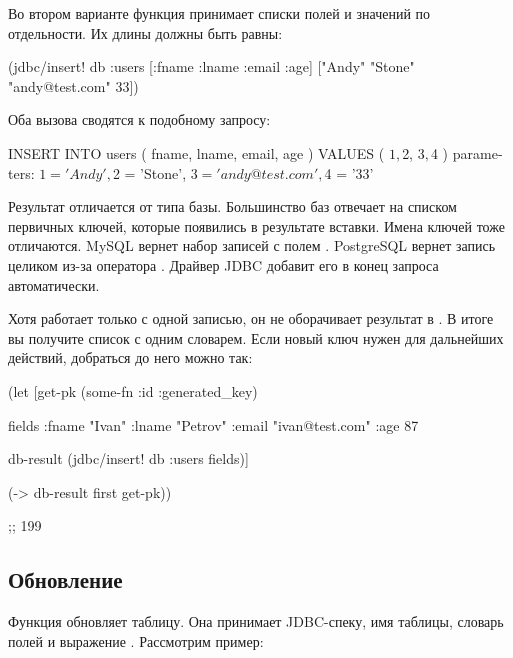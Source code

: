 Во втором варианте функция принимает списки полей и значений по отдельности. Их длины должны быть равны:

\begin{english}
  \begin{clojure}
(jdbc/insert! db :users
              [:fname :lname :email :age]
              ["Andy" "Stone" "andy@test.com" 33])
  \end{clojure}
\end{english}

Оба вызова сводятся к подобному запросу:

\begin{english}
  \begin{sql}
INSERT INTO users ( fname, lname, email, age )
VALUES ( $1, $2, $3, $4 )
parameters:
  $1 = 'Andy', $2 = 'Stone',
  $3 = 'andy@test.com', $4 = '33'
  \end{sql}
\end{english}

Результат  отличается от типа базы. Большинство баз отвечает на  списком первичных ключей, которые появились в результате вставки. Имена ключей тоже отличаются. MySQL вернет набор записей с полем . PostgreSQL вернет запись целиком из-за оператора . Драйвер JDBC добавит его в конец запроса автоматически.

Хотя  работает только с одной записью, он не оборачивает результат в . В итоге вы получите список с одним словарем. Если новый ключ нужен для дальнейших действий, добраться до него можно так:

\begin{english}
  \begin{clojure}
(let [get-pk
      (some-fn :id :generated_key)

      fields
      {:fname "Ivan"
       :lname "Petrov"
       :email "ivan@test.com"
       :age 87}

      db-result
      (jdbc/insert! db :users fields)]

  (-> db-result first get-pk))

;; 199
  \end{clojure}
\end{english}

\subsection{Обновление}

Функция  обновляет таблицу. Она принимает JDBC-спеку, имя таблицы, словарь полей и выражение . Рассмотрим пример:

